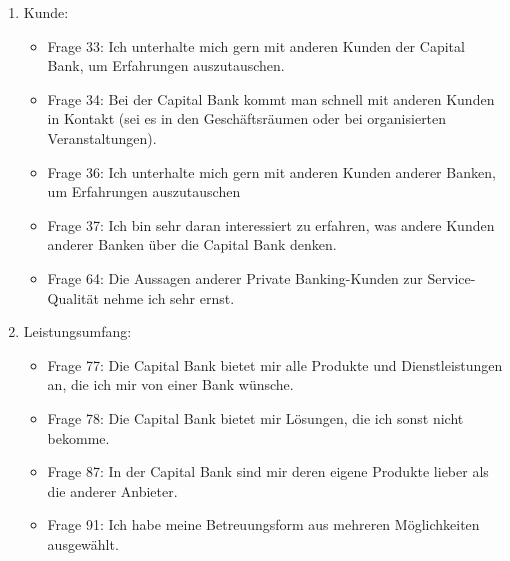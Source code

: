 \documentclass{article}\usepackage[]{graphicx}\usepackage[]{color}
\begin{document}
\begin{enumerate}
        \item Kunde:
    \begin{itemize}
    \item Frage 33:
    Ich unterhalte mich gern mit anderen Kunden der Capital Bank, um Erfahrungen auszutauschen.
    \item Frage 34:
    Bei der Capital Bank kommt man schnell mit anderen Kunden in Kontakt (sei es in den Geschäftsräumen oder bei organisierten Veranstaltungen).
    \item Frage 36:
    Ich unterhalte mich gern mit anderen Kunden anderer Banken, um Erfahrungen auszutauschen
    \item Frage 37:
    Ich bin sehr daran interessiert zu erfahren, was andere Kunden anderer Banken über die Capital Bank denken.
    \item Frage 64:
    Die Aussagen anderer Private Banking-Kunden zur Service-Qualität nehme ich sehr ernst.
    \end{itemize}
    
 
    
    


    
        \item Leistungsumfang:
    \begin{itemize}
   \item Frage 77:
    Die Capital Bank bietet mir alle Produkte und Dienstleistungen an, die ich mir von einer Bank wünsche.
    \item Frage 78:
    Die Capital Bank bietet mir Lösungen, die ich sonst nicht bekomme.
    \item Frage 87:
    In der Capital Bank sind mir deren eigene Produkte lieber als die anderer Anbieter.
    \item Frage 91:
    Ich habe meine Betreuungsform aus mehreren Möglichkeiten ausgewählt.
    \end{itemize}
    

\end{enumerate}
\end{document}
